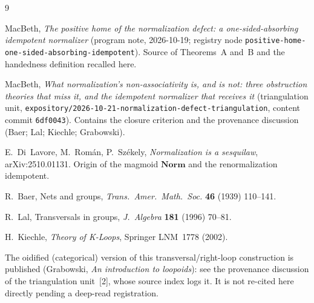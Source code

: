 \documentclass[11pt]{amsart}
\theoremstyle{plain}
\theoremstyle{definition}
\theoremstyle{remark}
\newcommand{\Norm}{\mathbf{Norm}}
\begin{document}
\begin{thebibliography}{9}

MacBeth, \emph{The positive home of the normalization defect: a one-sided-absorbing idempotent
normalizer} (program note, 2026-10-19; registry node
\texttt{positive-home-one-sided-absorbing-idempotent}). Source of Theorems~A and~B and the handedness
definition recalled here.

MacBeth, \emph{What normalization's non-associativity is, and is not: three obstruction theories that
miss it, and the idempotent normalizer that receives it} (triangulation unit,
\texttt{expository/2026-10-21-normalization-defect-triangulation}, content commit \texttt{6df0043}).
Contains the closure criterion and the provenance discussion (Baer; Lal; Kiechle; Grabowski).

E.~Di~Lavore, M.~Rom\'an, P.~Sz\'ekely, \emph{Normalization is a sesquilaw}, arXiv:2510.01131. Origin
of the magmoid $\Norm$ and the renormalization idempotent.

R.~Baer, Nets and groups, \emph{Trans.\ Amer.\ Math.\ Soc.} \textbf{46} (1939) 110--141.

R.~Lal, Transversals in groups, \emph{J.\ Algebra} \textbf{181} (1996) 70--81.

H.~Kiechle, \emph{Theory of K-Loops}, Springer LNM~1778 (2002).

\end{thebibliography}

\noindent\footnotesize The oidified (categorical) version of this transversal/right-loop construction
is published (Grabowski, \emph{An introduction to loopoids}): see the provenance discussion of
the triangulation unit~[2], whose source index logs it. It is not re-cited here directly pending a
deep-read registration.
\end{document}
